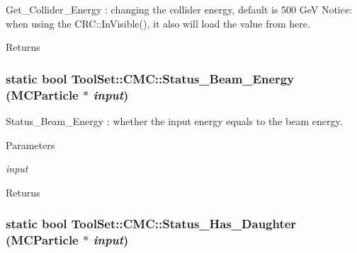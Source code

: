 Get\_\-Collider\_\-Energy : changing the collider energy, default is 500 GeV Notice: when using the CRC::InVisible(), it also will load the value from here. \begin{DoxyReturn}{Returns}

\end{DoxyReturn}
\hypertarget{classToolSet_1_1CMC_a3ebc24c0c160ba37054b294059f09d96}{
\subsubsection[{Status\_\-Beam\_\-Energy}]{\setlength{\rightskip}{0pt plus 5cm}static bool ToolSet::CMC::Status\_\-Beam\_\-Energy (MCParticle $\ast$ {\em input})}}
\label{classToolSet_1_1CMC_a3ebc24c0c160ba37054b294059f09d96}


Status\_\-Beam\_\-Energy : whether the input energy equals to the beam energy. 
\begin{DoxyParams}{Parameters}
\item[{\em input}]\end{DoxyParams}
\begin{DoxyReturn}{Returns}

\end{DoxyReturn}
\hypertarget{classToolSet_1_1CMC_a1771a4a8936446f9dfe5f9d22b5d9322}{
\subsubsection[{Status\_\-Has\_\-Daughter}]{\setlength{\rightskip}{0pt plus 5cm}static bool ToolSet::CMC::Status\_\-Has\_\-Daughter (MCParticle $\ast$ {\em input})}}
\label{classToolSet_1_1CMC_a1771a4a8936446f9dfe5f9d22b5d9322}


